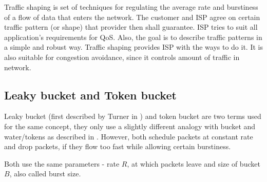 Traffic shaping is set of techniques for regulating the average rate and burstiness of a flow of data that enters the network. The customer and ISP agree on certain traffic pattern (or shape) that provider then shall guarantee. ISP tries to suit all application's requirements for QoS. Also, the goal is to describe traffic patterns in a simple and robust way. Traffic shaping provides ISP with the ways to do it. It is also suitable for congestion avoidance, since it controls amount of traffic in network.


\subsection{Leaky bucket and Token bucket}
\label{token_bucket}
Leaky bucket (first described by Turner in \cite{turner1986new}) and token bucket are two terms used for the same concept, they only use a slightly different analogy with bucket and water/tokens as described in \cite[Section 5.4.2]{Tanenbaum:2002:CN:572404}. However, both schedule packets at constant rate and drop packets, if they flow too fast while allowing certain burstiness.

Both use the same parameters - rate $R$, at which packets leave and size of bucket $B$, also called burst size.

